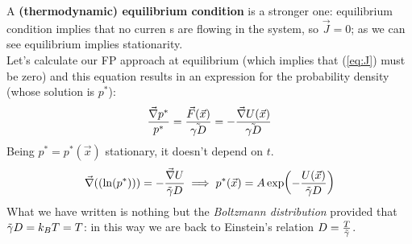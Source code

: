 \documentclass[\main/main.tex]{subfiles}
\begin{document}
A \textbf{(thermodynamic) equilibrium condition} is a stronger one: equilibrium condition implies that no curren s are flowing in the system, so $\vec{J}=0$; as we can see equilibrium implies stationarity. \\

Let's calculate our FP approach at equilibrium (which implies that (\ref{eq:J}) must be zero) and this equation results in an expression for the probability density (whose solution is $p^*$):
\begin{eqnarray}
\frac{\vec{\nabla}p^*}{p^*}=\frac{\vec{F}(\vec{x})}{\Tilde{\gamma D}}= -\frac{\vec{\nabla} U(\vec{x})}{\Tilde{\gamma D}}
\end{eqnarray}
Being $p^*=p^*(\vec{x})$ stationary, it doesn't depend on $t$. 
\begin{eqnarray}
\vec{\nabla}((\ln (p^*)))=-\frac{\vec{\nabla} U}{\Tilde{\gamma} D} \implies p^*(\vec{x})=A\exp(-\frac{U(\vec{x})}{\Tilde{\gamma} D})
\end{eqnarray}
What we have written is nothing but the \textit{Boltzmann distribution} provided that $\Tilde{\gamma}D=k_B T= T$: in this way we are back to Einstein's relation $D=\frac{T}{\Tilde{\gamma}}$.
\end{document}
